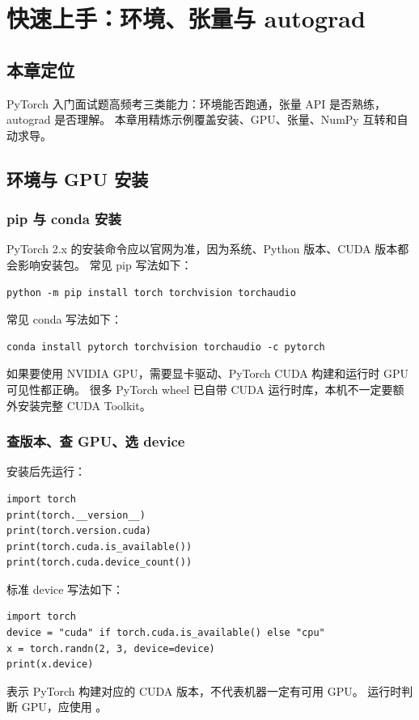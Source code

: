 \chapter{快速上手：环境、张量与 autograd}
\section{本章定位}
PyTorch 入门面试题高频考三类能力：环境能否跑通，张量 API 是否熟练，autograd 是否理解。
本章用精炼示例覆盖安装、GPU、张量、NumPy 互转和自动求导。

\section{环境与 GPU 安装}
\subsection{pip 与 conda 安装}
PyTorch 2.x 的安装命令应以官网为准，因为系统、Python 版本、CUDA 版本都会影响安装包。
常见 pip 写法如下：
\begin{lstlisting}[style=plainstyle]
python -m pip install torch torchvision torchaudio
\end{lstlisting}
常见 conda 写法如下：
\begin{lstlisting}[style=plainstyle]
conda install pytorch torchvision torchaudio -c pytorch
\end{lstlisting}
如果要使用 NVIDIA GPU，需要显卡驱动、PyTorch CUDA 构建和运行时 GPU 可见性都正确。
很多 PyTorch wheel 已自带 CUDA 运行时库，本机不一定要额外安装完整 CUDA Toolkit。

\subsection{查版本、查 GPU、选 device}
安装后先运行：
\begin{lstlisting}
import torch
print(torch.__version__)
print(torch.version.cuda)
print(torch.cuda.is_available())
print(torch.cuda.device_count())
\end{lstlisting}
标准 device 写法如下：
\begin{lstlisting}
import torch
device = "cuda" if torch.cuda.is_available() else "cpu"
x = torch.randn(2, 3, device=device)
print(x.device)
\end{lstlisting}
\begin{trap}
 表示 PyTorch 构建对应的 CUDA 版本，不代表机器一定有可用 GPU。
运行时判断 GPU，应使用 。
\end{trap}

